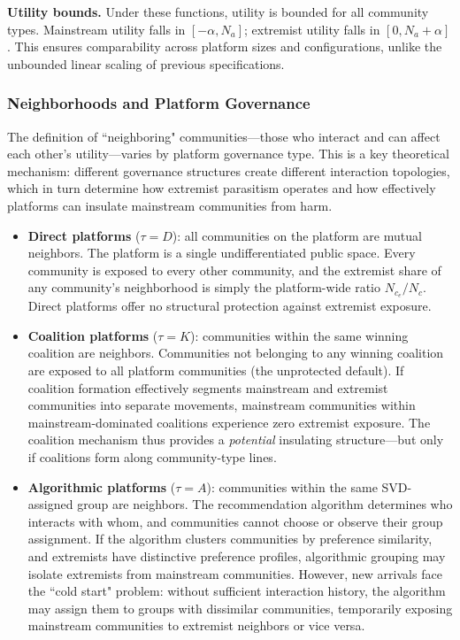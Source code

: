 \documentclass[12pt]{article}
\begin{document}
\textbf{Utility bounds.} Under these functions, utility is bounded for all community types. Mainstream utility falls in $[-\alpha, N_a]$; extremist utility falls in $[0, N_a + \alpha]$. This ensures comparability across platform sizes and configurations, unlike the unbounded linear scaling of previous specifications.

\subsubsection{Neighborhoods and Platform Governance}
\label{sec:neighborhoods}

The definition of ``neighboring" communities---those who interact and can affect each other's utility---varies by platform governance type. This is a key theoretical mechanism: different governance structures create different interaction topologies, which in turn determine how extremist parasitism operates and how effectively platforms can insulate mainstream communities from harm.

\begin{itemize}
    \item \textbf{Direct platforms} ($\tau = D$): all communities on the platform are mutual neighbors. The platform is a single undifferentiated public space. Every community is exposed to every other community, and the extremist share of any community's neighborhood is simply the platform-wide ratio $N_{c_e} / N_c$. Direct platforms offer no structural protection against extremist exposure.
    
    \item \textbf{Coalition platforms} ($\tau = K$): communities within the same winning coalition are neighbors. Communities not belonging to any winning coalition are exposed to all platform communities (the unprotected default). If coalition formation effectively segments mainstream and extremist communities into separate movements, mainstream communities within mainstream-dominated coalitions experience zero extremist exposure. The coalition mechanism thus provides a \textit{potential} insulating structure---but only if coalitions form along community-type lines.
    
    \item \textbf{Algorithmic platforms} ($\tau = A$): communities within the same SVD-assigned group are neighbors. The recommendation algorithm determines who interacts with whom, and communities cannot choose or observe their group assignment. If the algorithm clusters communities by preference similarity, and extremists have distinctive preference profiles, algorithmic grouping may isolate extremists from mainstream communities. However, new arrivals face the ``cold start" problem: without sufficient interaction history, the algorithm may assign them to groups with dissimilar communities, temporarily exposing mainstream communities to extremist neighbors or vice versa.
\end{itemize}
\end{document}
